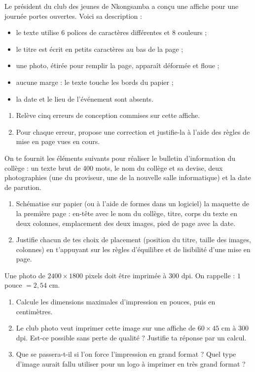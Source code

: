 \documentclass[11pt]{article}
\begin{document}
\begin{exercice}
Le président du club des jeunes de Nkongsamba a conçu une affiche pour une journée portes ouvertes. Voici sa description :
\begin{itemize}
\item le texte utilise 6 polices de caractères différentes et 8 couleurs ;
\item le titre est écrit en petits caractères au bas de la page ;
\item une photo, étirée pour remplir la page, apparaît déformée et floue ;
\item aucune marge : le texte touche les bords du papier ;
\item la date et le lieu de l'événement sont absents.
\end{itemize}
\begin{enumerate}
\item Relève cinq erreurs de conception commises sur cette affiche.
\item Pour chaque erreur, propose une correction et justifie-la à l'aide des règles de mise en page vues en cours.
\end{enumerate}
\end{exercice}

\begin{exercice}
On te fournit les éléments suivants pour réaliser le bulletin d'information du collège : un texte brut de 400 mots, le nom du collège et sa devise, deux photographies (une du proviseur, une de la nouvelle salle informatique) et la date de parution.
\begin{enumerate}
\item Schématise sur papier (ou à l'aide de formes dans un logiciel) la maquette de la première page : en-tête avec le nom du collège, titre, corps du texte en deux colonnes, emplacement des deux images, pied de page avec la date.
\item Justifie chacun de tes choix de placement (position du titre, taille des images, colonnes) en t'appuyant sur les règles d'équilibre et de lisibilité d'une mise en page.
\end{enumerate}
\end{exercice}

\begin{exercice}
Une photo de $2400 \times 1800$ pixels doit être imprimée à $300$ dpi. On rappelle : $1$ pouce $= 2,54$ cm.
\begin{enumerate}
\item Calcule les dimensions maximales d'impression en pouces, puis en centimètres.
\item Le club photo veut imprimer cette image sur une affiche de $60 \times 45$ cm à $300$ dpi. Est-ce possible sans perte de qualité ? Justifie ta réponse par un calcul.
\item Que se passera-t-il si l'on force l'impression en grand format ? Quel type d'image aurait fallu utiliser pour un logo à imprimer en très grand format ?
\end{enumerate}
\end{exercice}
\end{document}
